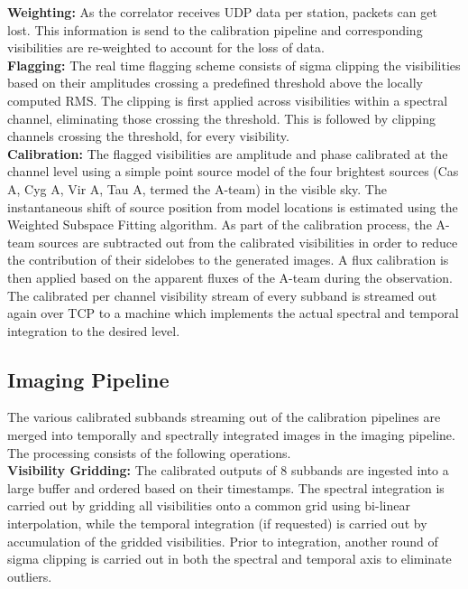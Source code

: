 \documentclass{ws-jai}
\begin{document}
\noindent \textbf {Weighting:} As the  correlator receives UDP data per station,
packets can get  lost. This information is send to  the calibration pipeline and
corresponding visibilities are re-weighted to account for the loss of data. \\

\noindent \textbf  {Flagging:} The  real time flagging  scheme consists  of sigma
clipping  the  visibilities based  on  their  amplitudes crossing  a  predefined
threshold above the  locally computed RMS. The clipping is  first applied across
visibilities  within   a  spectral  channel,  eliminating   those  crossing  the
threshold. This  is followed  by clipping channels  crossing the  threshold, for
every visibility.\\


\noindent  \textbf {Calibration:}  The  flagged visibilities  are amplitude  and
phase calibrated at the  channel level using a simple point  source model of the
four brightest sources  (Cas A, Cyg A, Vir  A, Tau A, termed the  A-team) in the
visible sky. The instantaneous shift of  source position from model locations is
estimated  using  the  Weighted Subspace  Fitting  \citep  {viberg1991detection}
algorithm. As part of the calibration process, the A-team sources are subtracted
out from  the calibrated  visibilities in  order to  reduce the  contribution of
their sidelobes  to the generated  images.  A  flux calibration is  then applied
based  on  the apparent  fluxes  of  the  A-team  during the  observation.   The
calibrated per channel visibility stream of  every subband is streamed out again
over  TCP  to a  machine  which  implements  the  actual spectral  and  temporal
integration to the desired level.\\

\subsection{Imaging Pipeline} 
The various calibrated  subbands streaming out of the  calibration pipelines are
merged  into  temporally  and  spectrally   integrated  images  in  the  imaging
pipeline. The processing consists of the following operations.\\

\noindent \textbf  {Visibility Gridding:} The  calibrated outputs of  8 subbands
are ingested  into a large  buffer and ordered  based on their  timestamps.  The
spectral integration is  carried out by gridding all visibilities  onto a common
grid using bi-linear interpolation, while the temporal integration (if requested)
is  carried  out   by  accumulation  of  the  gridded   visibilities.  Prior  to
integration, another round of sigma clipping is carried out in both the spectral
and temporal axis to eliminate outliers.\\
\end{document}
